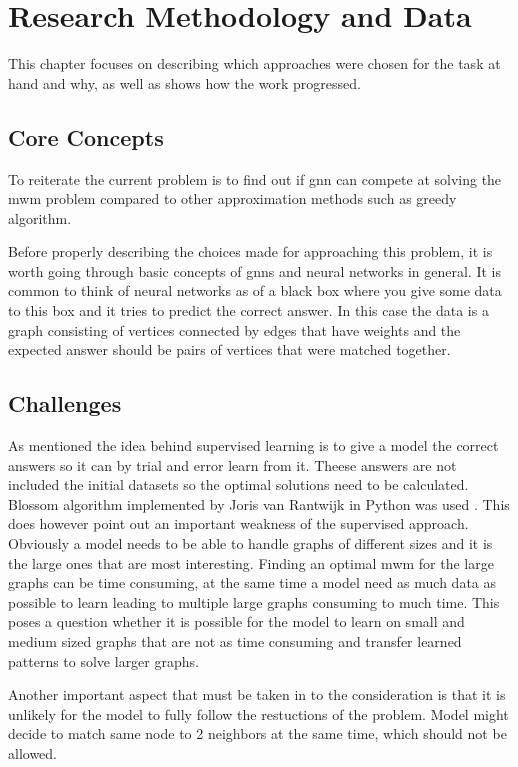 \chapter{Research Methodology and Data}

This chapter focuses on describing which approaches were chosen for the task at hand and why, as well as shows how the work progressed. 

\section{Core Concepts}

To reiterate the current problem is to find out if \gls{gnn} can compete at solving the \gls{mwm} problem compared to other approximation methods such as greedy algorithm.

Before properly describing the choices made for approaching this problem, it is worth going through basic concepts of \gls{gnn}s and neural networks in general. It is common to think of neural networks as of a black box where you give some data to this box and it tries to predict the correct answer. In this case the data is a graph consisting of vertices connected by edges that have weights and the expected answer should be pairs of vertices that were matched together.



\section{Challenges}

As mentioned the idea behind supervised learning is to give a model the correct answers so it can by trial and error learn from it. Theese answers are not included the initial datasets so the optimal solutions need to be calculated. Blossom algorithm implemented by Joris van Rantwijk in Python was used \cite{mwmBlossom}. This does however point out an important weakness of the supervised approach. Obviously a model needs to be able to handle graphs of different sizes and it is the large ones that are most interesting. Finding an optimal \gls{mwm} for the large graphs can be time consuming, at the same time a model need as much data as possible to learn leading to multiple large graphs consuming to much time. This poses a question whether it is possible for the model to learn on small and medium sized graphs that are not as time consuming and transfer learned patterns to solve larger graphs.

Another important aspect that must be taken in to the consideration is that it is unlikely for the model to fully follow the restuctions of the problem. Model might decide to match same node to 2 neighbors at the same time, which should not be allowed. 

